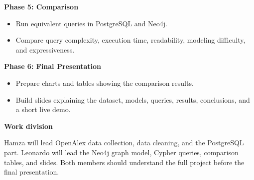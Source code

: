 \documentclass[10pt]{article}
\begin{document}
\textbf{Phase 5: Comparison}
\begin{itemize}
    \item Run equivalent queries in PostgreSQL and Neo4j.
    \item Compare query complexity, execution time, readability, modeling difficulty, and expressiveness.
\end{itemize}

\textbf{Phase 6: Final Presentation}
\begin{itemize}
    \item Prepare charts and tables showing the comparison results.
    \item Build slides explaining the dataset, models, queries, results, conclusions, and a short live demo.
\end{itemize}

\textbf{Work division}

Hamza will lead OpenAlex data collection, data cleaning, and the PostgreSQL part.
Leonardo will lead the Neo4j graph model, Cypher queries, comparison tables, and slides.
Both members should understand the full project before the final presentation.
\end{document}
